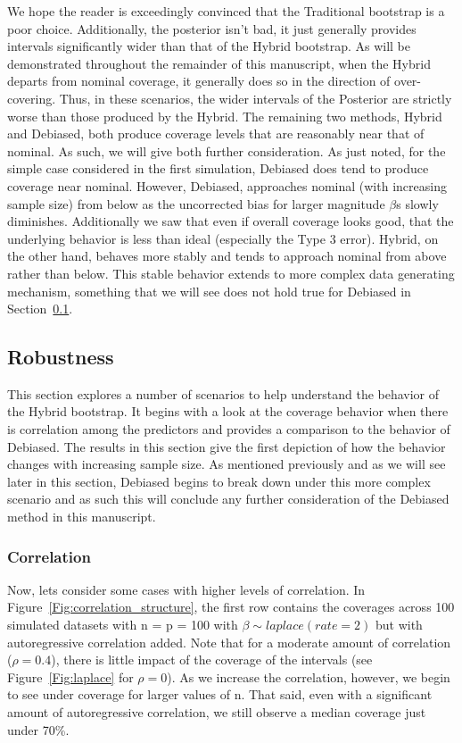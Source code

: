 We hope the reader is exceedingly convinced that the Traditional bootstrap is a poor choice. Additionally, the posterior isn't bad, it just generally provides intervals significantly wider than that of the Hybrid bootstrap. As will be demonstrated throughout the remainder of this manuscript, when the Hybrid departs from nominal coverage, it generally does so in the direction of over-covering. Thus, in these scenarios, the wider intervals of the Posterior are strictly worse than those produced by the Hybrid. The remaining two methods, Hybrid and Debiased, both produce coverage levels that are reasonably near that of nominal. As such, we will give both further consideration. As just noted, for the simple case considered in the first simulation, Debiased does tend to produce coverage near nominal. However, Debiased, approaches nominal (with increasing sample size) from below as the uncorrected bias for larger magnitude $\beta$s slowly diminishes. Additionally we saw that even if overall coverage looks good, that the underlying behavior is less than ideal (especially the Type 3 error). Hybrid, on the other hand, behaves more stably and tends to approach nominal from above rather than below. This stable behavior extends to more complex data generating mechanism, something that we will see does not hold true for Debiased in Section~\ref{Sec:Robustness}.

\subsection{Robustness}\label{Sec:Robustness}

This section explores a number of scenarios to help understand the behavior of the Hybrid bootstrap. It begins with a look at the coverage behavior when there is correlation among the predictors and provides a comparison to the behavior of Debiased. The results in this section give the first depiction of how the behavior changes with increasing sample size. As mentioned previously and as we will see later in this section, Debiased begins to break down under this more complex scenario and as such this will conclude any further consideration of the Debiased method in this manuscript. 

\subsubsection{Correlation}

Now, lets consider some cases with higher levels of correlation. In Figure~\ref{Fig:correlation_structure}, the first row contains the coverages across 100 simulated datasets with n = p = 100 with $\beta \sim laplace(rate = 2)$ but with autoregressive correlation added. Note that for a moderate amount of correlation ($\rho = 0.4$), there is little impact of the coverage of the intervals (see Figure~\ref{Fig:laplace} for $\rho = 0$).  As we increase the correlation, however, we begin to see under coverage for larger values of n. That said, even with a significant amount of autoregressive correlation, we still observe a median coverage just under 70\%.

